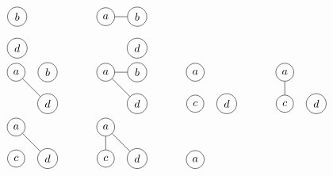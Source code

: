 \documentclass[12pt, A4]{article}
\begin{document}
\begin{enumerate}
\[\begin{tabular}{*{4}{p{0.2\textwidth}}}
\begin{tikzpicture}
								\node[circle, draw] (b) at (1, 1) {\(b\)};
								\node[circle, draw] (d) at (1, 0) {\(d\)};
							\end{tikzpicture}
						&
							\begin{tikzpicture}
								\node[circle, draw] (a) at (0, 1) {\(a\)};
								\node[circle, draw] (b) at (1, 1) {\(b\)};
								\node[circle, draw] (d) at (1, 0) {\(d\)};
								\draw (a) to (b);
							\end{tikzpicture}
						\\
							\begin{tikzpicture}
								\node[circle, draw] (a) at (0, 1) {\(a\)};
								\node[circle, draw] (b) at (1, 1) {\(b\)};
								\node[circle, draw] (d) at (1, 0) {\(d\)};
								\draw (a) to (d);
							\end{tikzpicture}
						&
							\begin{tikzpicture}
								\node[circle, draw] (a) at (0, 1) {\(a\)};
								\node[circle, draw] (b) at (1, 1) {\(b\)};
								\node[circle, draw] (d) at (1, 0) {\(d\)};
								\draw (a) to (b);
								\draw (a) to (d);
							\end{tikzpicture}
						&
							\begin{tikzpicture}
								\node[circle, draw] (a) at (0, 1) {\(a\)};
								\node[circle, draw] (c) at (0, 0) {\(c\)};
								\node[circle, draw] (d) at (1, 0) {\(d\)};
							\end{tikzpicture}
						&
							\begin{tikzpicture}
								\node[circle, draw] (a) at (0, 1) {\(a\)};
								\node[circle, draw] (c) at (0, 0) {\(c\)};
								\node[circle, draw] (d) at (1, 0) {\(d\)};
								\draw (a) to (c);
							\end{tikzpicture}
						\\
							\begin{tikzpicture}
								\node[circle, draw] (a) at (0, 1) {\(a\)};
								\node[circle, draw] (c) at (0, 0) {\(c\)};
								\node[circle, draw] (d) at (1, 0) {\(d\)};
								\draw (a) to (d);
							\end{tikzpicture}
						&
							\begin{tikzpicture}
								\node[circle, draw] (a) at (0, 1) {\(a\)};
								\node[circle, draw] (c) at (0, 0) {\(c\)};
								\node[circle, draw] (d) at (1, 0) {\(d\)};
								\draw (a) to (c);
								\draw (a) to (d);
							\end{tikzpicture}
						&
							\begin{tikzpicture}
								\node[circle, draw] (a) at (0, 1) {\(a\)};

\end{tikzpicture}
\end{tabular}\]
\end{enumerate}
\end{document}
